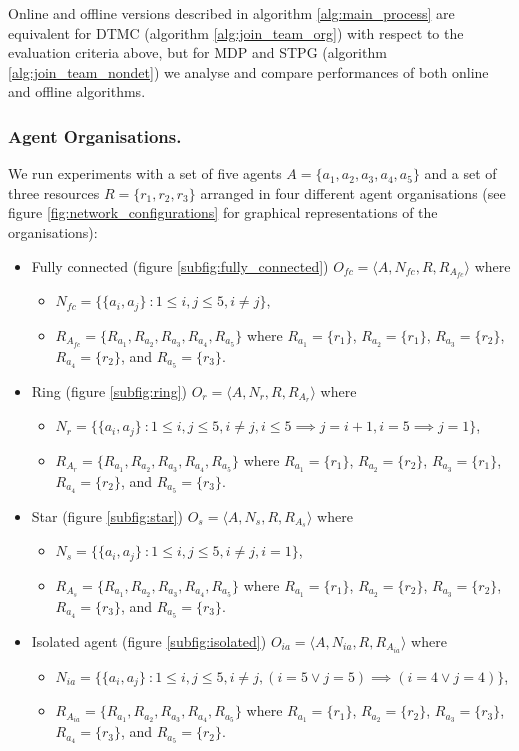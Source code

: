 \documentclass{llncs}
\begin{document}
Online and offline versions described in algorithm \ref{alg:main_process} are equivalent for DTMC (algorithm \ref{alg:join_team_org}) with respect to the evaluation criteria above, but for MDP and STPG (algorithm \ref{alg:join_team_nondet}) we analyse and compare performances of both online and offline algorithms.


\subsubsection{Agent Organisations.}
We run experiments with a set of five agents $A= \{ a_1,a_2,a_3,a_4,a_5 \} $ and a set of  three resources $R=\{r_1,r_2,r_3\}$ arranged in four different agent organisations (see figure \ref{fig:network_configurations} for graphical representations of the organisations):
\begin{itemize}
 \item Fully connected (figure \ref{subfig:fully_connected}) $O_{fc}=\langle A, N_{fc}, R, R_{A_{fc}}  \rangle$ where
    \begin{itemize}
    \item $N_{fc}=\{\{a_i,a_j \}\ : 1 \le i,j \le 5, i\neq j \}$,
    \item $R_{A_{fc}}=\{R_{a_1}, R_{a_2}, R_{a_3}, R_{a_4}, R_{a_5}\}$ where $R_{a_1}=\{r_1\}$, $R_{a_2}=\{r_1\}$, $R_{a_3}=\{r_2\}$, $R_{a_4}=\{r_2\}$, and $R_{a_5}=\{r_3\}$.
    \end{itemize}
 \item Ring (figure \ref{subfig:ring}) $O_r=\langle A, N_r, R, R_{A_r}  \rangle$ where
    \begin{itemize}
    \item $N_r=\{\{a_i,a_j \}\ : 1 \le i,j \le 5, i\neq j, i\le 5 \implies j=i+1, i=5 \implies j=1 \}$,
    \item $R_{A_r}=\{R_{a_1}, R_{a_2}, R_{a_3}, R_{a_4}, R_{a_5}\}$ where $R_{a_1}=\{r_1\}$, $R_{a_2}=\{r_2\}$, $R_{a_3}=\{r_1\}$, $R_{a_4}=\{r_2\}$, and $R_{a_5}=\{r_3\}$.
    \end{itemize}
 \item Star (figure \ref{subfig:star}) $O_s=\langle A, N_s, R, R_{A_s}  \rangle$ where
    \begin{itemize}
    \item $N_s=\{\{a_i,a_j \}\ : 1 \le i,j \le 5, i\neq j, i=1 \}$,
    \item $R_{A_s}=\{R_{a_1}, R_{a_2}, R_{a_3}, R_{a_4}, R_{a_5}\}$ where $R_{a_1}=\{r_1\}$, $R_{a_2}=\{r_2\}$, $R_{a_3}=\{r_2\}$, $R_{a_4}=\{r_3\}$, and $R_{a_5}=\{r_3\}$.
    \end{itemize}
 \item Isolated agent (figure \ref{subfig:isolated}) $O_{ia}=\langle A, N_{ia}, R, R_{A_{ia}}  \rangle$ where
    \begin{itemize}
    \item $N_{ia}=\{\{a_i,a_j \}\ : 1 \le i,j \le 5, i\neq j, (i=5 \vee j=5) \implies (i=4 \vee j=4) \}$,
    \item $R_{A_{ia}}=\{R_{a_1}, R_{a_2}, R_{a_3}, R_{a_4}, R_{a_5}\}$ where $R_{a_1}=\{r_1\}$, $R_{a_2}=\{r_2\}$, $R_{a_3}=\{r_3\}$, $R_{a_4}=\{r_3\}$, and $R_{a_5}=\{r_2\}$.
    \end{itemize}
\end{itemize}
\end{document}
